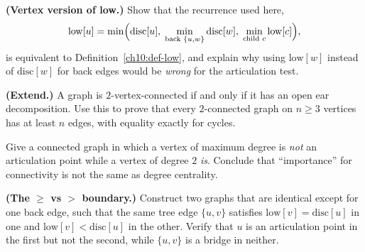 \begin{exercise}
\textbf{(Vertex version of low.)} Show that the recurrence used here,
\[
  \mathrm{low}[u] = \min\Bigl(
    \mathrm{disc}[u],\;
    \min_{\text{back }\{u,w\}}\mathrm{disc}[w],\;
    \min_{\text{child }c}\mathrm{low}[c]
  \Bigr),
\]
is equivalent to Definition~\ref{ch10:def-low}, and explain why using $\mathrm{low}[w]$ instead of $\mathrm{disc}[w]$ for back edges would be \emph{wrong} for the articulation test.
\end{exercise}

\begin{exercise}
\textbf{(Extend.)} A graph is $2$-vertex-connected if and only if it has an open ear
decomposition. Use this to prove that every $2$-connected graph on $n\ge3$ vertices has
at least $n$ edges, with equality exactly for cycles.
\end{exercise}

\begin{exercise}
Give a connected graph in which a vertex of maximum degree is \emph{not} an articulation
point while a vertex of degree $2$ \emph{is}. Conclude that ``importance'' for
connectivity is not the same as degree centrality.
\end{exercise}

\begin{exercise}
\textbf{(The $\ge$ vs $>$ boundary.)} Construct two graphs that are identical except
for one back edge, such that the same tree edge $\{u,v\}$ satisfies
$\mathrm{low}[v]=\mathrm{disc}[u]$ in one and $\mathrm{low}[v]<\mathrm{disc}[u]$ in the
other. Verify that $u$ is an articulation point in the first but not the second, while
$\{u,v\}$ is a bridge in neither.
\end{exercise}

